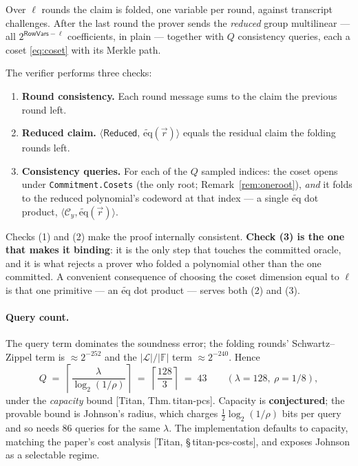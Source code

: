 \documentclass[11pt,a4paper]{article}
\newcommand{\F}{\mathbb{F}}
\newcommand{\dom}{\mathcal{L}}
\newcommand{\eq}{\widetilde{\mathrm{eq}}}
\newcommand{\paper}[1]{\textsf{[Titan, #1]}}
\theoremstyle{definition}
\begin{document}
Over $\ell$ rounds the claim is folded, one variable per round, against transcript
challenges. After the last round the prover sends the \emph{reduced} group multilinear
--- all $2^{\mathsf{RowVars}-\ell}$ coefficients, in plain --- together with $Q$
consistency queries, each a coset \eqref{eq:coset} with its Merkle path.

The verifier performs three checks:
\begin{enumerate}[label=(\arabic*),leftmargin=*]
  \item \textbf{Round consistency.} Each round message sums to the claim the previous
        round left.
  \item \textbf{Reduced claim.} $\langle \mathsf{Reduced},\, \eq(\vec r)\rangle$ equals
        the residual claim the folding rounds left.
  \item \textbf{Consistency queries.} For each of the $Q$ sampled indices: the coset
        opens under \texttt{Commitment.Cosets} (the only root; Remark~\ref{rem:oneroot}),
        \emph{and} it folds to the reduced
        polynomial's codeword at that index --- a single $\eq$ dot product,
        $\langle \mathcal{C}_y, \eq(\vec r)\rangle$.
\end{enumerate}

Checks (1) and (2) make the proof internally consistent. \textbf{Check (3) is the one
that makes it binding}: it is the only step that touches the committed oracle, and it
is what rejects a prover who folded a polynomial other than the one committed. A
convenient consequence of choosing the coset dimension equal to $\ell$ is that one
primitive --- an $\eq$ dot product --- serves both (2) and (3).

\paragraph{Query count.}
The query term dominates the soundness error; the folding rounds' Schwartz--Zippel term
is $\approx 2^{-252}$ and the $|\dom|/|\F|$ term $\approx 2^{-240}$. Hence
\begin{equation}
  Q \;=\; \left\lceil \frac{\lambda}{\log_2(1/\rho)} \right\rceil
  \;=\; \left\lceil \frac{128}{3} \right\rceil \;=\; 43
  \qquad (\lambda = 128,\ \rho = 1/8),
  \label{eq:queries}
\end{equation}
under the \emph{capacity} bound \paper{Thm.\,titan-pcs}. Capacity is
\textbf{conjectured}; the provable bound is Johnson's radius, which charges
$\tfrac{1}{2}\log_2(1/\rho)$ bits per query and so needs $86$ queries for the same
$\lambda$. The implementation defaults to capacity, matching the paper's cost analysis
\paper{\S\,titan-pcs-costs}, and exposes Johnson as a selectable regime.
\end{document}

